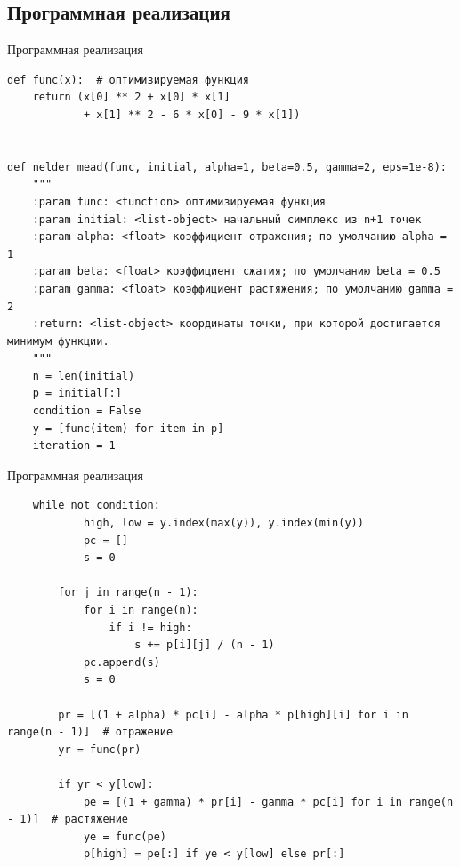 \documentclass[aspectratio=169, mathserif]{beamer}	%
\begin{document}
\subsection{Программная реализация}
\begin{frame}[fragile]{Программная реализация}
\scriptsize
\begin{verbatim}
def func(x):  # оптимизируемая функция
    return (x[0] ** 2 + x[0] * x[1]
            + x[1] ** 2 - 6 * x[0] - 9 * x[1])


def nelder_mead(func, initial, alpha=1, beta=0.5, gamma=2, eps=1e-8):
    """
    :param func: <function> оптимизируемая функция
    :param initial: <list-object> начальный симплекс из n+1 точек
    :param alpha: <float> коэффициент отражения; по умолчанию alpha = 1
    :param beta: <float> коэффициент сжатия; по умолчанию beta = 0.5
    :param gamma: <float> коэффициент растяжения; по умолчанию gamma = 2
    :return: <list-object> координаты точки, при которой достигается минимум функции.
    """
    n = len(initial)
    p = initial[:]
    condition = False
    y = [func(item) for item in p]
    iteration = 1
\end{verbatim}
\vfill
\end{frame}


\begin{frame}[fragile]{Программная реализация}
\scriptsize
\begin{verbatim}
    while not condition:
            high, low = y.index(max(y)), y.index(min(y))
            pc = []
            s = 0

        for j in range(n - 1):
            for i in range(n):
                if i != high:
                    s += p[i][j] / (n - 1)
            pc.append(s)
            s = 0

        pr = [(1 + alpha) * pc[i] - alpha * p[high][i] for i in range(n - 1)]  # отражение
        yr = func(pr)

        if yr < y[low]:
            pe = [(1 + gamma) * pr[i] - gamma * pc[i] for i in range(n - 1)]  # растяжение
            ye = func(pe)
            p[high] = pe[:] if ye < y[low] else pr[:]
\end{verbatim}
\vfill
\end{frame}
\end{document}
